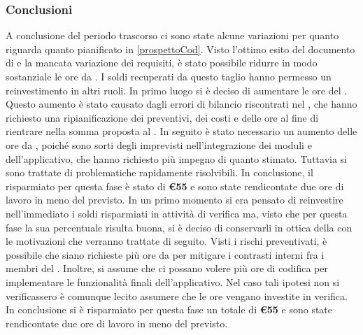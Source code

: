 \subsubsection{Conclusioni}\label{conclusioniFC}
A conclusione del periodo trascorso ci sono state alcune variazioni per quanto riguarda quanto pianificato in \ref{prospettoCod}.\newline
Visto l'ottimo esito del documento di \AR e la mancata variazione dei requisiti, è stato possibile ridurre in modo sostanziale le ore da \rA.\newline
I soldi recuperati da questo taglio hanno permesso un reinvestimento in altri ruoli.\newline
In primo luogo si è deciso di aumentare le ore del \rRP.\newline
Questo aumento è stato causato dagli errori di bilancio riscontrati nel \PP, che hanno richiesto una ripianificazione dei preventivi, dei costi e delle ore al fine di rientrare nella somma proposta al .\newline
In seguito è stato necessario un aumento delle ore da \rp, poiché sono sorti degli imprevisti nell'integrazione dei moduli  e  dell'applicativo, che hanno richiesto più impegno di quanto stimato. Tuttavia si sono trattate di problematiche rapidamente risolvibili.\newline
In conclusione, il risparmiato per questa fase è stato di \textbf{\euro55} e sono state rendicontate due ore di lavoro in meno del previsto.\newline
In un primo momento si era pensato di reinvestire nell'immediato i soldi risparmiati in attività di verifica ma, visto che per questa fase la sua percentuale risulta buona, si è deciso di conservarli in ottica della \fVV con le motivazioni che verranno trattate di seguito.
Visti i rischi preventivati, è possibile che siano richieste più ore da \rRP per mitigare i contrasti interni fra i membri del . Inoltre, si assume che ci possano volere più ore di codifica per implementare le funzionalità finali dell'applicativo. Nel caso tali ipotesi non si verificassero è comunque lecito assumere che le ore vengano investite in verifica.
In conclusione si è risparmiato per questa fase un totale di \textbf{\euro55} e sono state rendicontate due ore di lavoro in meno del previsto.\newline

